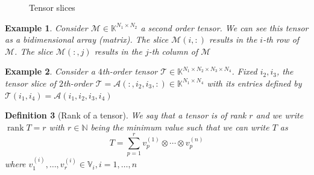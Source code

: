 \documentclass[11pt,a4paper,openright,oneside]{book}
\numberwithin{equation}{section}
\newtheorem{defn0}{Definition}[chapter]
\newtheorem{example0}[defn0]{Example}
\newenvironment{definition}{ \begin{defn0}}{\end{defn0}}
\newenvironment{example}{ \begin{example0}\rm}{\end{example0}}
\DeclareMathOperator{\rank}{rank}
\begin{document}
\begin{figure}[h]
    \centering
    \label{fig:slicing}
    \caption{Tensor slices}
\end{figure}


\begin{example}
    Consider $\mathcal{M} \in \mathbb{K}^{N_1 \times N_2}$ a second order tensor. We can see this tensor as a
    bidimensional array (matrix). The slice $\mathcal{M}(i, :)$ results in the $i$-th row of $\mathcal{M}$.
    The slice $\mathcal{M}(:, j)$ results in the $j$-th column of $\mathcal{M}$
\end{example}

\begin{example}
    Consider a $4$th-order tensor $\mathcal{T} \in \mathbb{K}^{N_1 \times N_2 \times N_3 \times N_4}$. 
    Fixed $i_2, i_3$, the tensor slice of $2$th-order $\mathcal{T} = \mathcal{A}(:, i_2, i_3, :) \in \mathbb{K}^{N_1 \times N_4}$ 
    with its entries defined by ${\mathcal{T}(i_1, i_4) = \mathcal{A}(i_1, i_2, i_3, i_4)}$
\end{example}

\begin{definition}[Rank of a tensor] 
    We say that a tensor is of rank $r$ and we write $\rank{T} = r$
    with $r \in \mathbb{N}$ being the minimum value such that we can write $T$ as
$$T= \sum_{p=1}^r v_p^{(1)} \otimes \cdots \otimes v_p^{(n)}$$
where $v_1^{(i)}, \dots, v_r^{(i)} \in \mathbb{V}_i, i = 1, \dots, n$
\end{definition}
\end{document}
